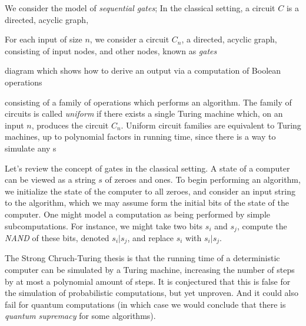 





We consider the model of \emph{sequential gates}; In the classical setting, a circuit $C$ is a directed, acyclic graph, 

For each input of size $n$, we consider a circuit $C_n$, a directed, acyclic graph, consisting of input nodes, and other nodes, known as \emph{gates}

 diagram which shows how to derive an output via a computation of Boolean operations

consisting of a family of operations which performs an algorithm. The family of circuits is called \emph{uniform} if there exists a single Turing machine which, on an input $n$, produces the circuit $C_n$. Uniform circuit families are equivalent to Turing machines, up to polynomial factors in running time, since there is a way to simulate any s

Let's review the concept of gates in the classical setting. A state of a computer can be viewed as a string $s$ of zeroes and ones. To begin performing an algorithm, we initialize the state of the computer to all zeroes, and consider an input string to the algorithm, which we may assume form the initial bits of the state of the computer. One might model a computation as being performed by simple subcomputations. For instance, we might take two bits $s_i$ and $s_j$, compute the \emph{NAND} of these bits, denoted $s_i | s_j$, and replace $s_i$ with $s_i | s_j$.

The Strong Chruch-Turing thesis is that the running time of a deterministic computer can be simulated by a Turing machine, increasing the number of steps by at most a polynomial amount of steps. It is conjectured that this is false for the simulation of probabilistic computations, but yet unproven. And it could also fail for quantum computations (in which case we would conclude that there is \emph{quantum supremacy} for some algorithms).








